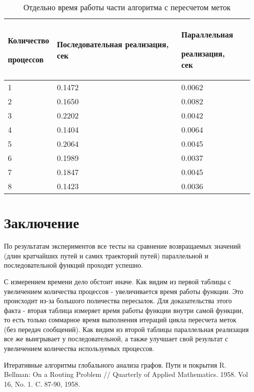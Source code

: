 \documentclass{report}
\begin{document}
\begin{table}[h]
    \begin{tabular}{ | p{4cm} | p{4cm} | p{4cm} | p{4cm} | }
    \hline
    Количество \par процессов & Последовательная реализация, сек & Параллельная \par реализация, сек\\ \hline
    1    &0.1472  & 0.0062  \\ \hline
    2    &0.1650  & 0.0082  \\ \hline
    3    &0.2202  & 0.0042   \\ \hline
    4    &0.1404  & 0.0064  \\ \hline
    5    &0.2064  & 0.0045  \\ \hline
    6    &0.1989  & 0.0037  \\ \hline
    7    &0.1847  & 0.0045  \\ \hline
    8    &0.1423  & 0.0036  \\ \hline
    \end{tabular}
    \caption{Отдельно время работы части алгоритма с пересчетом меток}
\end{table}


\newpage

\section{Заключение}

По результатам экспериментов все тесты на сравнение возвращаемых значений (длин кратчайших путей и самих траекторий путей)
	параллельной и последовательной функций проходят успешно.
\par

С измерением времени дело обстоит иначе. Как видим из первой таблицы с увеличением количества процессов - увеличивается время работы функции.
Это происходит из-за большого поличества пересылок. Для доказательства этого факта - вторая таблица измеряет время работы функции внутри самой функции,
то есть только соммарное время выполнения итераций цикла пересчета меток (без передач сообщений). Как видим из второй таблицы параллельная 
реализация все же выигрывает у последовательной, а также улучшает свой результат с увеличением количества используемых процессов.


\begin{thebibliography}{1}
Итеративные алгоритмы глобального анализа графов. Пути и покрытия 
R. Bellman: On a Routing Problem // Quarterly of Applied Mathematics. 1958. Vol 16, No. 1. C. 87-90, 1958.
\end{thebibliography}
\end{document}
